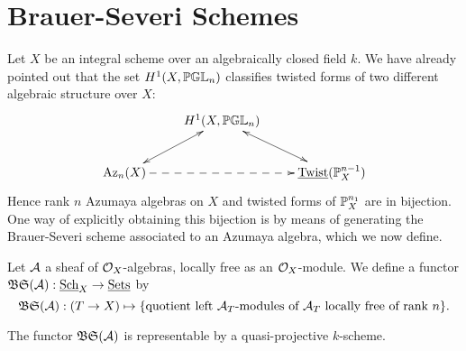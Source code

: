\section{Brauer-Severi Schemes}
Let $X$ be an integral scheme over an algebraically closed field $k$.  We have already pointed out that the set $H^1(X,\mathbb{PGL}_n)$ classifies twisted forms of two different algebraic structure over $X$:
$$\xymatrix{
& \ar@{<->}[dl]H^1(X,\bbpgl_n) \ar@{<->}[dr]&\\
\Az_n(X)\ar@{-->}[rr] & & \twist(\bbp_X^{n-1})
}$$
Hence rank $n$ Azumaya algebras on $X$ and twisted forms of $\mathbb{P}^{n_1}_X$ are in bijection.  One way of explicitly obtaining this bijection is by means of generating the Brauer-Severi scheme associated to an Azumaya algebra, which we now define.

Let $\mathcal{A}$ a sheaf of $\mathcal{O}_X$-algebras, locally free as an $\mathcal{O}_X$-module.  We define a functor $\mathfrak{BS}(\mathcal{A}): \textnormal{\underline{Sch}}_X\rightarrow \textnormal{\underline{Sets}}$ by
$$\mathfrak{BS}(\mathcal{A}): (T\rightarrow X)\mapsto \{\text{quotient left $\mathcal{A}_T$-modules of $\mathcal{A}_T$ locally free of rank $n$}\}.$$
\begin{lem}
The functor $\mathfrak{BS}(\mathcal{A})$ is representable by a quasi-projective $k$-scheme.
\end{lem}
